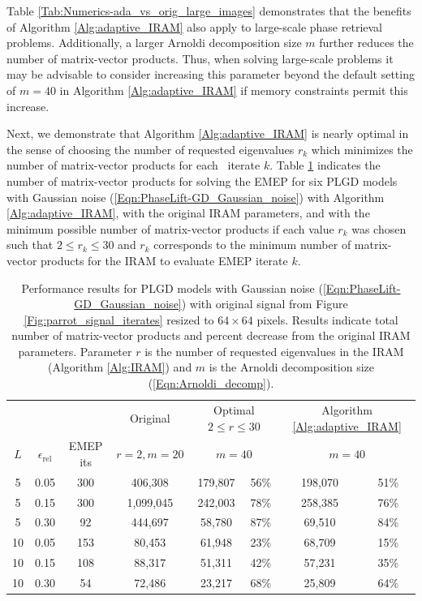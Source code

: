 

Table \ref{Tab:Numerics-ada_vs_orig_large_images} demonstrates that the benefits of Algorithm \ref{Alg:adaptive_IRAM} also apply to large-scale phase retrieval problems.
Additionally, a larger Arnoldi decomposition size $m$ further reduces the number of matrix-vector products.
Thus, when solving large-scale problems it may be advisable to consider increasing this parameter beyond the default setting of $m=40$ in Algorithm \ref{Alg:adaptive_IRAM} if memory constraints permit this increase.



Next, we demonstrate that Algorithm \ref{Alg:adaptive_IRAM} is nearly optimal in the sense of choosing the number of requested eigenvalues $r_k$ which minimizes the number of matrix-vector products for each \emep \ iterate $k$.
Table \ref{Tab:Numerics-num_matvecs_opt_vs_ada} indicates the number of matrix-vector products for solving the EMEP for six PLGD models with Gaussian noise (\ref{Eqn:PhaseLift-GD_Gaussian_noise}) with Algorithm \ref{Alg:adaptive_IRAM}, with the original IRAM parameters, and with the minimum possible number of matrix-vector products if each value $r_k$ was chosen such that $2 \leq r_k\leq 30$ and $r_k$ corresponds to the minimum number of matrix-vector products for the IRAM to evaluate EMEP iterate $k$.


\begin{table}[H]
\centering
\begin{tabular}{ |ccc|c|cc|cc| }
 \hline
			&&&  Original
			&  \multicolumn{2}{c|}{Optimal $2 \leq r \leq 30$}
			&	\multicolumn{2}{c|}{Algorithm \ref{Alg:adaptive_IRAM}}	\\
$L$ & $\epsilon_\text{rel}$ & EMEP its & $r=2, m=20$	& \multicolumn{2}{c|}{$m=40$}  & \multicolumn{2}{c|}{$m=40$}   \\
 \hline
 5 &  0.05 & 300 &  406,308  &  179,807 & 56\% &  198,070 & 51\% \\ 
  5 &  0.15 & 300 & 1,099,045  &  242,003 & 78\% &  258,385 & 76\% \\ 
  5 &  0.30 &  92 &  444,697  &   58,780 & 87\% &   69,510 & 84\% \\ 
 10 &  0.05 & 153 &   80,453  &   61,948 & 23\% &   68,709 & 15\% \\ 
 10 &  0.15 & 108 &   88,317  &   51,311 & 42\% &   57,231 & 35\% \\ 
 10 &  0.30 &  54 &   72,486  &   23,217 & 68\% &   25,809 & 64\% \\ 
 \hline
\end{tabular}

\caption{
Performance results for PLGD models with Gaussian noise (\ref{Eqn:PhaseLift-GD_Gaussian_noise}) with original signal from Figure \ref{Fig:parrot_signal_iterates} resized to $64 \times 64$ pixels.
Results indicate total number of matrix-vector products and percent decrease from the original IRAM parameters.
Parameter $r$ is the number of requested eigenvalues in the IRAM (Algorithm \ref{Alg:IRAM}) and $m$ is the Arnoldi decomposition size (\ref{Eqn:Arnoldi_decomp}).
} \label{Tab:Numerics-num_matvecs_opt_vs_ada}
\end{table}

